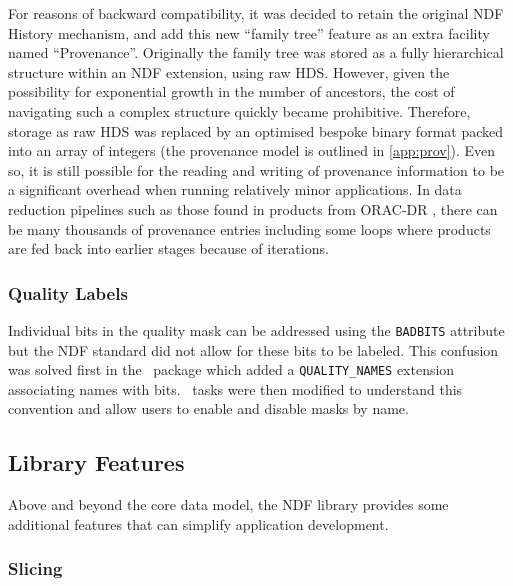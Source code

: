 \documentclass[final,authoryear,5p,times,twocolumn]{elsarticle}
\begin{document}
For reasons of backward compatibility, it was decided to retain the
original NDF History mechanism, and add this new ``family tree''
feature as an extra facility named ``Provenance''.  Originally the
family tree was stored as a fully hierarchical structure within an NDF
extension, using raw HDS. However, given the possibility for
exponential growth in the number of ancestors, the cost of navigating
such a complex structure quickly became prohibitive. Therefore,
storage as raw HDS was replaced by an optimised bespoke binary format
packed into an array of integers (the provenance model is outlined in
\ref{app:prov}). Even so, it is still possible for
the reading and writing of provenance information to be a significant
overhead when running relatively minor applications.  In data
reduction pipelines such as those found in products from ORAC-DR
\citep{2008AN....329..295C}, there can be many thousands of provenance
entries including some loops where products are fed back into earlier
stages because of iterations.

\subsubsection{Quality Labels}

Individual bits in the quality mask can be addressed using the
\texttt{BADBITS} attribute but the NDF standard did not allow for
these bits to be labeled. This confusion was solved first in the
\iras\ package which added a \texttt{QUALITY\_NAMES}
extension associating names with bits. \KAPPA\ tasks were then
modified to understand this convention and allow users to enable and
disable masks by name.

\subsection{Library Features}

Above and beyond the core data model, the NDF library provides some
additional features that can simplify application development.

\subsubsection{Slicing}
\end{document}
